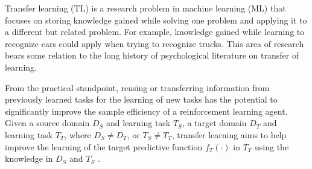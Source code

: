 \hspace{0.5cm} Transfer learning (TL) is a research problem in machine learning (ML) that focuses on storing knowledge gained while solving one problem and applying it to a different but related problem. For example, knowledge gained while learning to recognize cars could apply when trying to recognize trucks. This area of research bears some relation to the long history of psychological literature on transfer of learning.

From the practical standpoint, reusing or transferring information from previously learned tasks for the learning of new tasks has the potential to significantly improve the sample efficiency of a reinforcement learning agent. Given a source domain $D_S$ and learning task $T_S$, a target domain $D_T$ and learning task $T_T$, where $D_S \neq D_T$, or $T_S \neq T_T$, transfer learning aims to help improve the learning of the target predictive function $f_T(\cdot)$ in $T_T$ using the knowledge in $D_S$ and $T_S$ \cite{wiki:trnsflrn}.
\vspace*{\fill}